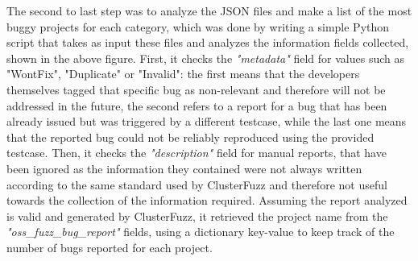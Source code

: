 The second to last step was to analyze the JSON files and make a list of the most buggy projects for each category, which was done by writing a simple Python script that takes as input these files and analyzes the information fields collected, shown in the above figure. First, it checks the \textit{"metadata"} field for values such as "WontFix", "Duplicate" or "Invalid": the first means that the developers themselves tagged that specific bug as non-relevant and therefore will not be addressed in the future, the second refers to a report for a bug that has been already issued but was triggered by a different testcase, while the last one means that the reported bug could not be reliably reproduced using the provided testcase. Then, it checks the \textit{"description"} field for manual reports, that have been ignored as the information they contained were not always written according to the same standard used by ClusterFuzz and therefore not useful towards the collection of the information required. Assuming the report analyzed is valid and generated by ClusterFuzz, it retrieved the project name from the \textit{"oss\_fuzz\_bug\_report"} fields, using a dictionary key-value to keep track of the number of bugs reported for each project. 

